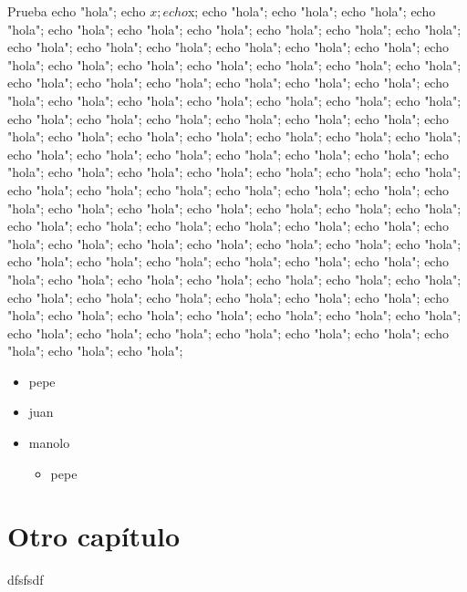 \documentclass[a4paper,11pt]{memoir}
\begin{document}
\begin{php}{Prueba}
echo "hola"; echo $x; echo $x;
echo "hola";
echo "hola";
echo "hola";
echo "hola";
echo "hola";
echo "hola";
echo "hola";
echo "hola";
echo "hola";
echo "hola";
echo "hola";
echo "hola";
echo "hola";
echo "hola";
echo "hola";
echo "hola";
echo "hola";
echo "hola";
echo "hola";
echo "hola";
echo "hola";
echo "hola";
echo "hola";
echo "hola";
echo "hola";
echo "hola";
echo "hola";
echo "hola";
echo "hola";
echo "hola";
echo "hola";
echo "hola";
echo "hola";
echo "hola";
echo "hola";
echo "hola";
echo "hola";
echo "hola";
echo "hola";
echo "hola";
echo "hola";
echo "hola";
echo "hola";
echo "hola";
echo "hola";
echo "hola";
echo "hola";
echo "hola";
echo "hola";
echo "hola";
echo "hola";
echo "hola";
echo "hola";
echo "hola";
echo "hola";
echo "hola";
echo "hola";
echo "hola";
echo "hola";
echo "hola";
echo "hola";
echo "hola";
echo "hola";
echo "hola";
echo "hola";
echo "hola";
echo "hola";
echo "hola";
echo "hola";
echo "hola";
echo "hola";
echo "hola";
echo "hola";
echo "hola";
echo "hola";
echo "hola";
echo "hola";
echo "hola";
echo "hola";
echo "hola";
echo "hola";
echo "hola";
echo "hola";
echo "hola";
echo "hola";
echo "hola";
echo "hola";
echo "hola";
echo "hola";
echo "hola";
echo "hola";
echo "hola";
echo "hola";
echo "hola";
echo "hola";
echo "hola";
echo "hola";
echo "hola";
echo "hola";
echo "hola";
echo "hola";
echo "hola";
echo "hola";
echo "hola";
echo "hola";
echo "hola";
echo "hola";
echo "hola";
echo "hola";
echo "hola";
echo "hola";
echo "hola";
echo "hola";
echo "hola";
echo "hola";
echo "hola";
echo "hola";
echo "hola";
echo "hola";
echo "hola";
echo "hola";
echo "hola";
echo "hola";

\end{php}

\begin{itemize}
  \item pepe
  \item juan
  \item manolo
  \begin{itemize}
    \item pepe
  \end{itemize}
\end{itemize}


\chapter{Otro capítulo}

dfsfsdf
\end{document}
